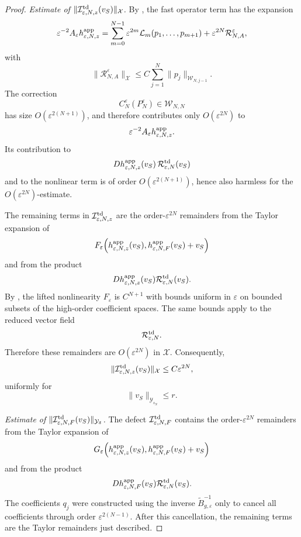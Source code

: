 \documentclass[11pt]{article}
\theoremstyle{definition}
\theoremstyle{remark}
\numberwithin{equation}{section}
\begin{document}
\begin{proof}
\medskip
\noindent\emph{Estimate of
\(\|\mathcal I_{\varepsilon,N,z}^{\rm td}(v_S)\|_{\mathcal X}\).}
By , the fast operator term has
the expansion
\[
\varepsilon^{-2}
A_\varepsilon h_{\varepsilon,N,z}^{\rm app}
=
\sum_{m=0}^{N-1}
\varepsilon^{2m}
\mathcal L_m(p_1,\dots,p_{m+1})
+
\varepsilon^{2N}\mathcal R_{N,A}^\varepsilon,
\]
with
\[
\|\mathcal R_{N,A}^\varepsilon\|_{\mathcal X}
\le
C\sum_{j=1}^N
\|p_j\|_{\mathcal W_{N,j-1}}.
\]
The correction
\[
C_N^\varepsilon(P_N^\varepsilon)\in\mathcal W_{N,N}
\]
has size \(O(\varepsilon^{2(N+1)})\), and therefore contributes only \(O(\varepsilon^{2N})\) to
\[
\varepsilon^{-2}A_\varepsilon h_{\varepsilon,N,z}^{\rm app}.
\]
Its contribution to
\[
Dh_{\varepsilon,N,z}^{\rm app}(v_S)\,
\mathcal R_{\varepsilon,N}^{\rm td}(v_S)
\]
and to the nonlinear term is of order \(O(\varepsilon^{2(N+1)})\), hence also harmless
for the \(O(\varepsilon^{2N})\)-estimate.

The remaining terms in
\(\mathcal I_{\varepsilon,N,z}^{\rm td}\) are the order-\(\varepsilon^{2N}\) remainders
from the Taylor expansion of
\[
F_\varepsilon\Big(
h_{\varepsilon,N,z}^{\rm app}(v_S),
h_{\varepsilon,N,F}^{\rm app}(v_S)+v_S
\Big)
\]
and from the product
\[
Dh_{\varepsilon,N,z}^{\rm app}(v_S)
\mathcal R_{\varepsilon,N}^{\rm td}(v_S).
\]
By , the lifted nonlinearity
\(F_\varepsilon\) is \(C^{N+1}\) with bounds uniform in \(\varepsilon\) on
bounded subsets of the high-order coefficient spaces. The same bounds apply to
the reduced vector field
\[
\mathcal R_{\varepsilon,N}^{\rm td}.
\]
Therefore these remainders are \(O(\varepsilon^{2N})\) in \(\mathcal X\). Consequently,
\[
\|\mathcal I_{\varepsilon,N,z}^{\rm td}(v_S)\|_{\mathcal X}
\le
C\varepsilon^{2N},
\]
uniformly for
\[
\|v_S\|_{\mathcal Y_{s_N}}\le r.
\]

\medskip
\noindent\emph{Estimate of
\(\|\mathcal I_{\varepsilon,N,F}^{\rm td}(v_S)\|_{\mathcal Y_\delta}\).}
The defect
\(\mathcal I_{\varepsilon,N,F}^{\rm td}\) contains the order-\(\varepsilon^{2N}\)
remainders from the Taylor expansion of
\[
G_\varepsilon\Big(
h_{\varepsilon,N,z}^{\rm app}(v_S),
h_{\varepsilon,N,F}^{\rm app}(v_S)+v_S
\Big)
\]
and from the product
\[
Dh_{\varepsilon,N,F}^{\rm app}(v_S)
\mathcal R_{\varepsilon,N}^{\rm td}(v_S).
\]
The coefficients \(q_j\) were constructed using the inverse
\(\widetilde B_{g,\varepsilon}^{-1}\)
only to cancel all coefficients through order \(\varepsilon^{2(N-1)}\).
After this cancellation, the remaining terms are the Taylor remainders just described.


\end{proof}
\end{document}
